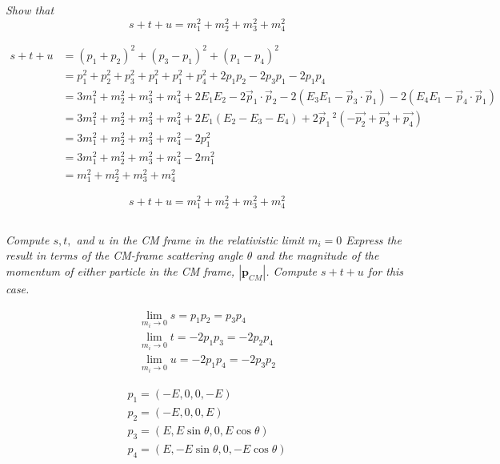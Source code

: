 \documentclass{article}
\begin{document}
\subsection{}
\textit{Show that
$$
s+t+u=m_{1}^{2}+m_{2}^{2}+m_{3}^{2}+m_{4}^{2}
$$}

\begin{align*}
s+t+u &=\left(p_{1}+p_{2}\right)^{2} +\left(p_{3}-p_{1}\right)^{2}+\left(p_{1}-p_{4}\right)^{2}\\
&= p_{1}^{2}+p_{2}^{2}+p_{3}^{2}+p_{1}^{2}+p_{1}^{2}+p_{4}^{2} +2 p_{1} p_{2}-2 p_{3} p_{1}-2 p_{1} p_{4}\\
&=3 m_{1}^{2}+m_{2}^{2}+m_{3}^{2}+m_{4}^{2}+2 E_{1} E_{2}-2 \vec{p}_{1} \cdot \vec{p}_{2}-2\left(E_{3} E_{1}-\vec{p}_{3} \cdot \vec{p}_{1}\right)-2\left( E_{4} E_{1}-\vec{p}_{4} \cdot \vec{p}_{1}\right)\\
&= 3 m_{1}^{2}+m_{2}^{2}+m_{3}^{2}+m_{4}^{2} +2 E_{1}\left(E_{2}-E_{3}-E_{4}\right)+2 \vec{p}_{1}\, ^{2}\left(-\overrightarrow{p_{2}}+\overrightarrow{p_{3}}+\overrightarrow{p_{4}}\right)\\
&=3 m_{1}^{2}+m_{2}^{2}+m_{3}^{2}+m_{4}^{2}-2 p_{1}^{2}\\
&=3 m_{1}^{2}+m_{2}^{2}+m_{3}^{2}+m_{4}^{2}-2 m_{1}^{2} \\
&= m_{1}^{2}+m_{2}^{2}+m_{3}^{2}+m_{4}^{2}
\end{align*}

$$
\boxed{
s+t+u=m_{1}^{2}+m_{2}^{2}+m_{3}^{2}+m_{4}^{2}
}
$$

\newpage
\subsection{}
\textit{Compute $s, t,$ and $u$ in the CM frame in the relativistic limit $m_{i}=0$ Express the result in terms of the CM-frame scattering angle $\theta$ and the magnitude of the momentum of either particle in the CM frame, $\left|\mathbf{p}_{C M}\right|$. Compute $s+t+u$ for this case.}


\begin{align*}
\lim _{m_i \rightarrow 0} s=p_{1} p_{2}=p_{3} p_{4} \\
\lim _{m_i \rightarrow 0} t=-2 p_{1} p_{3}=-2 p_{2} p_{4} \\
\lim _{m_{i} \rightarrow 0} u=-2 p_{1} p_{4}=-2 p_{3} p_{2}
\end{align*}

\begin{align*}
p_{1}=(-E, 0,0, -E) \\
p_{2}=(-E, 0,0, E) \\
p_{3}=(E, E \sin \theta, 0, E \cos \theta) \\
p_{4}=\left(E,-E \sin \theta, 0,-E \cos \theta\right)
\end{align*}
\end{document}
